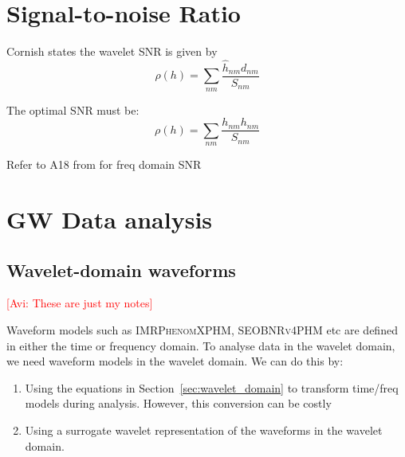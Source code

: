 \documentclass{article}
\newcommand{\avi}[1]{\textcolor{red}{[Avi: #1]}}
\begin{document}

\section{Signal-to-noise Ratio}

Cornish states the wavelet SNR is given by
\begin{equation}
    \rho(h) = \sum_{nm} \frac{\hat{h}_{nm}d_{nm}}{S_{nm}}
\end{equation}

The optimal SNR must be:
\begin{equation}
    \rho(h) = \sum_{nm} \frac{h_{nm}h_{nm}}{S_{nm}}
\end{equation}


Refer to A18 from \cite{Veitch:2010:PhRvD} for freq domain SNR


\newpage

\section{GW Data analysis}
\subsection{Wavelet-domain waveforms}
\avi{These are just my notes}

Waveform models such as \textsc{IMRPhenomXPHM}, \textsc{SEOBNRv4PHM} etc are defined in either the time or frequency domain. To analyse data in the wavelet domain, we need waveform models in the wavelet domain. We can do this by:
\begin{enumerate}
    \item Using the equations in Section~\ref{sec:wavelet_domain} to transform time/freq models during analysis. However, this conversion can be costly
    \item Using a surrogate wavelet representation of the waveforms in the wavelet domain.
\end{enumerate}
\end{document}
